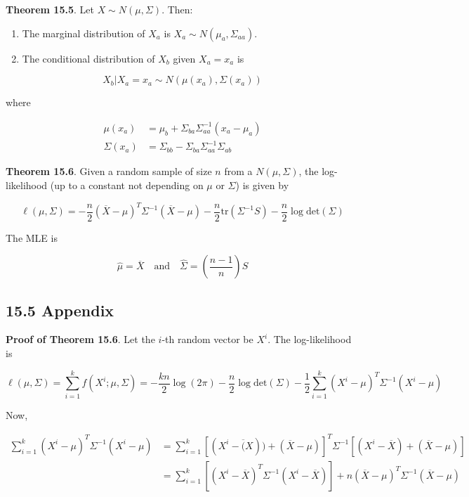 \textbf{Theorem 15.5}. Let \(X \sim N(\mu, \Sigma)\). Then:

\begin{enumerate}[tightlist,label={\arabic*.}]
\item
  The marginal distribution of \(X_a\) is
  \(X_a \sim N(\mu_a, \Sigma_{aa})\).
\item
  The conditional distribution of \(X_b\) given \(X_a = x_a\) is
\end{enumerate}

\[ X_b | X_a = x_a \sim N(\mu(x_a), \Sigma(x_a))\]

where

\begin{align}
\mu(x_a) &= \mu_b + \Sigma_{ba} \Sigma_{aa}^{-1} (x_a - \mu_a) \\
\Sigma(x_a) &= \Sigma_{bb} - \Sigma_{ba}\Sigma_{aa}^{-1}\Sigma_{ab}
\end{align}

\textbf{Theorem 15.6}. Given a random sample of size \(n\) from a
\(N(\mu, \Sigma)\), the log-likelihood (up to a constant not depending
on \(\mu\) or \(\Sigma\)) is given by

\[\ell(\mu, \Sigma) = -\frac{n}{2} (\overline{X} - \mu)^T \Sigma^{-1} (\overline{X} - \mu) - \frac{n}{2} \text{tr} \left( \Sigma^{-1}S \right) - \frac{n}{2} \log \text{det} \left( \Sigma \right) \]

The MLE is

\[ \hat{\mu} = \overline{X} 
\quad \text{and} \quad
\hat{\Sigma} = \left( \frac{n - 1}{n} \right) S\]

\subsection{15.5 Appendix}\label{appendix}

\textbf{Proof of Theorem 15.6}. Let the \(i\)-th random vector be
\(X^i\). The log-likelihood is

\[\ell(\mu, \Sigma) = \sum_{i = 1}^k f(X^i; \mu, \Sigma) 
= -\frac{kn}{2} \log ( 2\pi ) - \frac{n}{2} \log \text{det} \left( \Sigma \right)
- \frac{1}{2} \sum_{i=1}^k (X^i - \mu)^T \Sigma^{-1} (X^i - \mu)
\]

Now,

\begin{align}
\sum_{i=1}^k (X^i - \mu)^T \Sigma^{-1} (X^i - \mu) &=
\sum_{i=1}^k \left[ (X^i - \overline(X)) + (\overline{X} - \mu) \right]^T \Sigma^{-1} \left[(X^i - \overline{X}) + (\overline{X} - \mu) \right] \\
&= \sum_{i=1}^k [(X^i - \overline{X})^T\Sigma^{-1}(X^i - \overline{X})]
+ n (\overline{X} - \mu)^T \Sigma^{-1} (\overline{X} - \mu)
\end{align}

